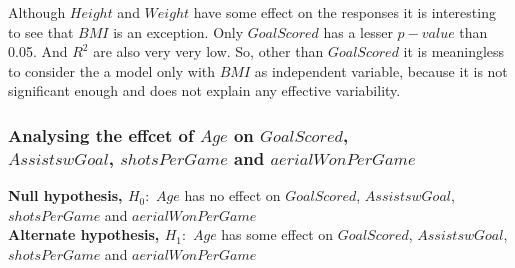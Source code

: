 \documentclass[12pt]{article}
\begin{document}
Although $ Height $ and $ Weight $ have some effect on the responses it is interesting to see that $ BMI $ is an exception. Only $ GoalScored $ has a lesser $ p-value $ than 0.05. And $ R^2 $ are also very very low. So, other than $ GoalScored $ it is meaningless to consider the a model only with $ BMI $ as independent variable, because it is not significant enough and does not explain any effective variability.

\newpage

\subsubsection{Analysing the effcet of $ Age $ on $ GoalScored $, \\ $ AssistswGoal $, $ shotsPerGame $ and $ aerialWonPerGame $}

\textbf{Null hypothesis, $ H_0: $} $ Age $ has no effect on $ GoalScored $, $ AssistswGoal $, $ shotsPerGame $ and $ aerialWonPerGame $\\
\textbf{Alternate hypothesis, $ H_1: $} $ Age $ has some effect on $ GoalScored $, $ AssistswGoal $, $ shotsPerGame $ and $ aerialWonPerGame $
 
\end{document}
